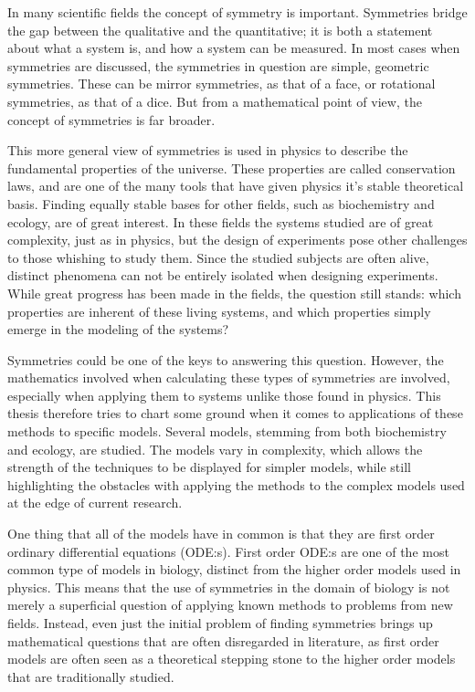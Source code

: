 
In many scientific fields the concept of symmetry is important.
Symmetries bridge the gap between the qualitative and the quantitative; it is both a statement about what a system is, and how a system can be measured.
In most cases when symmetries are discussed, the symmetries in question are simple, geometric symmetries.
These can be mirror symmetries, as that of a face, or rotational symmetries, as that of a dice.
But from a mathematical point of view, the concept of symmetries is far broader.

This more general view of symmetries is used in physics to describe the fundamental properties of the universe.
These properties are called conservation laws, and are one of the many tools that have given physics it's stable theoretical basis.
Finding equally stable bases for other fields, such as biochemistry and ecology, are of great interest.
In these fields the systems studied are of great complexity, just as in physics, but the design of experiments pose other challenges to those whishing to study them.
Since the studied subjects are often alive, distinct phenomena can not be entirely isolated when designing experiments.
While great progress has been made in the fields, the question still stands: which properties are inherent of these living systems, and which properties simply emerge in the modeling of the systems?

Symmetries could be one of the keys to answering this question.
However, the mathematics involved when calculating these types of symmetries are involved, especially when applying them to systems unlike those found in physics.
This thesis therefore tries to chart some ground when it comes to applications of these methods to specific models.
Several models, stemming from both biochemistry and ecology, are studied.
The models vary in complexity, which allows the strength of the techniques to be displayed for simpler models, while still highlighting the obstacles with applying the methods to the complex models used at the edge of current research.

One thing that all of the models have in common is that they are first order ordinary differential equations (ODE:s).
First order ODE:s are one of the most common type of models in biology, distinct from the higher order models used in physics.
This means that the use of symmetries in the domain of biology is not merely a superficial question of applying known methods to problems from new fields.
Instead, even just the initial problem of finding symmetries brings up mathematical questions that are often disregarded in literature, as first order models are often seen as a theoretical stepping stone to the higher order models that are traditionally studied.

